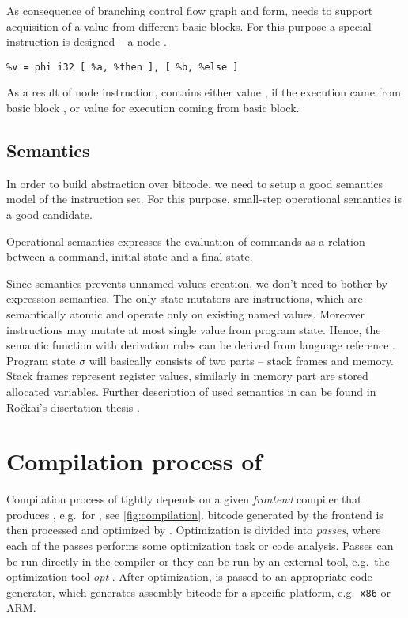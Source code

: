 As consequence of branching control flow graph and \SSA form, \LLVM needs to
support acquisition of a value from different basic blocks. For this
purpose a special instruction is designed -- a  node \cite{Cytron91}.

\begin{verbatim}
%v = phi i32 [ %a, %then ], [ %b, %else ]
\end{verbatim}

As a result of  node instruction,  contains either value ,
if the execution came from basic block , or value  for execution
coming from  basic block.

\subsection{Semantics} \label{subsec:semantics}

In order to build abstraction over \LLVM bitcode, we need to setup a good
semantics model of the instruction set. For this purpose, small-step operational
semantics \cite{Plotkin04} is a good candidate.

\begin{definition}
Operational semantics expresses the evaluation of commands as a relation between
a command, initial state and a final state.
\end{definition}

\noindent
Since \LLVMIR semantics prevents unnamed values creation, we don't need to
bother by expression semantics. The only state mutators are instructions, which are
semantically atomic and operate only on existing named values. Moreover
instructions may mutate at most single value from program state. Hence, the
semantic function with derivation rules can be derived from \LLVM
language reference \cite{LLVM:langref}. Program state $\sigma$ will basically
consists of two parts -- stack frames and memory. Stack frames represent
register values, similarly in memory part are stored allocated variables.
Further description of used \LLVM semantics in \DIVINE can be found in Ročkai's
disertation thesis \cite{Rockai15}.

\section{Compilation process of \LLVM} \label{sec:compilation}

Compilation process of \LLVM tightly depends on a given \emph{frontend} compiler that produces
\LLVMIR, e.g.~\clang for \Cpp{}, see \autoref{fig:compilation}.
\LLVM bitcode generated by the frontend is then processed and optimized by \LLVM.
Optimization is divided into \LLVM \emph{passes}, where each of the passes
performs some optimization task or code analysis. Passes can be run directly
in the compiler or they can be run by an external tool, e.g.~the \LLVM
optimization tool \emph{opt} \cite{LLVM:opt}. After optimization, \LLVMIR is passed to
an appropriate code generator, which generates assembly bitcode for a specific
platform, e.g.~\texttt{x86} or ARM.

